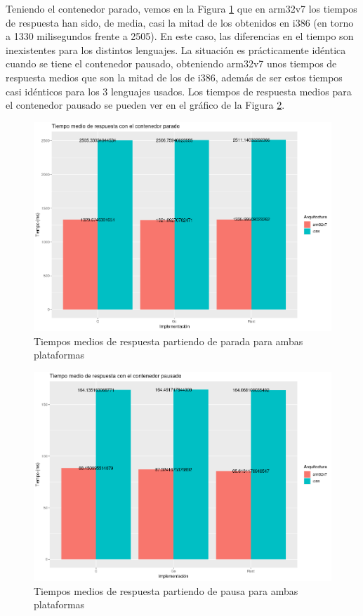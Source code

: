 Teniendo el contenedor parado, vemos en la Figura
\ref{fig:response-time-mean-stopped} que en arm32v7 los tiempos de respuesta han
sido, de media, casi la mitad de los obtenidos en i386 (en torno a 1330
milisegundos frente a 2505). En este caso, las diferencias en el tiempo son
inexistentes para los distintos lenguajes. La situación es prácticamente
idéntica cuando se tiene el contenedor pausado, obteniendo arm32v7 unos tiempos
de respuesta medios que son la mitad de los de i386, además de ser estos tiempos
casi idénticos para los 3 lenguajes usados. Los tiempos de respuesta medios para
el contenedor pausado se pueden ver en el gráfico de la Figura
\ref{fig:response-time-mean-paused}.

\begin{figure}
    \centering
    \includegraphics[width=\textwidth]{images/response-time/mean-stopped.png}
    \caption{Tiempos medios de respuesta partiendo de parada para ambas plataformas}
    \label{fig:response-time-mean-stopped}
\end{figure}

\begin{figure}
    \centering
    \includegraphics[width=\textwidth]{images/response-time/mean-paused.png}
    \caption{Tiempos medios de respuesta partiendo de pausa para ambas plataformas}
    \label{fig:response-time-mean-paused}
\end{figure}

